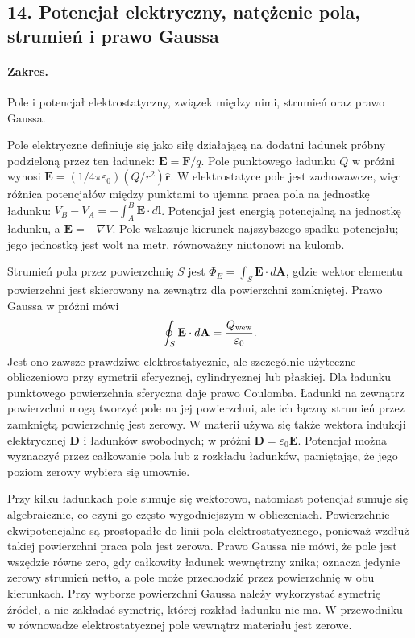 \documentclass[11pt,a4paper]{article}
\begin{document}
\subsection{14. Potencjał elektryczny, natężenie pola, strumień i prawo Gaussa}
\paragraph{Zakres.} Pole i potencjał elektrostatyczny, związek między nimi, strumień oraz prawo Gaussa.

Pole elektryczne definiuje się jako siłę działającą na dodatni ładunek próbny podzieloną przez ten ładunek: $\mathbf E=\mathbf F/q$. Pole punktowego ładunku $Q$ w próżni wynosi $\mathbf E=(1/4\pi\varepsilon_0)(Q/r^2)\hat{\mathbf r}$. W elektrostatyce pole jest zachowawcze, więc różnica potencjałów między punktami to ujemna praca pola na jednostkę ładunku: $V_B-V_A=-\int_A^B\mathbf E\cdot d\mathbf l$. Potencjał jest energią potencjalną na jednostkę ładunku, a $\mathbf E=-\nabla V$. Pole wskazuje kierunek najszybszego spadku potencjału; jego jednostką jest wolt na metr, równoważny niutonowi na kulomb.

Strumień pola przez powierzchnię $S$ jest $\Phi_E=\int_S\mathbf E\cdot d\mathbf A$, gdzie wektor elementu powierzchni jest skierowany na zewnątrz dla powierzchni zamkniętej. Prawo Gaussa w próżni mówi
\[
\oint_S\mathbf E\cdot d\mathbf A=\frac{Q_{\rm wew}}{\varepsilon_0}.
\]
Jest ono zawsze prawdziwe elektrostatycznie, ale szczególnie użyteczne obliczeniowo przy symetrii sferycznej, cylindrycznej lub płaskiej. Dla ładunku punktowego powierzchnia sferyczna daje prawo Coulomba. Ładunki na zewnątrz powierzchni mogą tworzyć pole na jej powierzchni, ale ich łączny strumień przez zamkniętą powierzchnię jest zerowy. W materii używa się także wektora indukcji elektrycznej $\mathbf D$ i ładunków swobodnych; w próżni $\mathbf D=\varepsilon_0\mathbf E$. Potencjał można wyznaczyć przez całkowanie pola lub z rozkładu ładunków, pamiętając, że jego poziom zerowy wybiera się umownie.

Przy kilku ładunkach pole sumuje się wektorowo, natomiast potencjał sumuje się algebraicznie, co czyni go często wygodniejszym w obliczeniach. Powierzchnie ekwipotencjalne są prostopadłe do linii pola elektrostatycznego, ponieważ wzdłuż takiej powierzchni praca pola jest zerowa. Prawo Gaussa nie mówi, że pole jest wszędzie równe zero, gdy całkowity ładunek wewnętrzny znika; oznacza jedynie zerowy strumień netto, a pole może przechodzić przez powierzchnię w obu kierunkach. Przy wyborze powierzchni Gaussa należy wykorzystać symetrię źródeł, a nie zakładać symetrię, której rozkład ładunku nie ma. W przewodniku w równowadze elektrostatycznej pole wewnątrz materiału jest zerowe.
\end{document}
